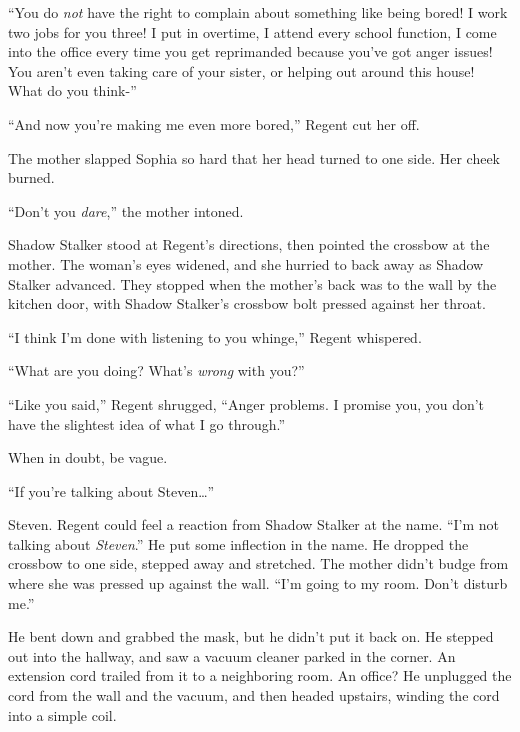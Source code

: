 ``You do \emph{not} have the right to complain about something like being bored!  I work two jobs for you three!  I put in overtime, I attend every school function, I come into the office every time you get reprimanded because you've got anger issues!  You aren't even taking care of your sister, or helping out around this house!  What do you think-''



``And now you're making me even more bored,'' Regent cut her off.



The mother slapped Sophia so hard that her head turned to one side.  Her cheek burned.



``Don't you \emph{dare},'' the mother intoned.



Shadow Stalker stood at Regent's directions, then pointed the crossbow at the mother.  The woman's eyes widened, and she hurried to back away as Shadow Stalker advanced.  They stopped when the mother's back was to the wall by the kitchen door, with Shadow Stalker's crossbow bolt pressed against her throat.



``I think I'm done with listening to you whinge,'' Regent whispered.



``What are you doing?  What's \emph{wrong} with you?''



``Like you said,'' Regent shrugged, ``Anger problems.  I promise you, you don't have the slightest idea of what I go through.''



When in doubt, be vague.



``If you're talking about Steven\ldots''



Steven.  Regent could feel a reaction from Shadow Stalker at the name.  ``I'm not talking about \emph{Steven}.''  He put some inflection in the name.  He dropped the crossbow to one side, stepped away and stretched.  The mother didn't budge from where she was pressed up against the wall.  ``I'm going to my room.  Don't disturb me.''



He bent down and grabbed the mask, but he didn't put it back on.  He stepped out into the hallway, and saw a vacuum cleaner parked in the corner.  An extension cord trailed from it to a neighboring room.  An office?  He unplugged the cord from the wall and the vacuum, and then headed upstairs, winding the cord into a simple coil.



